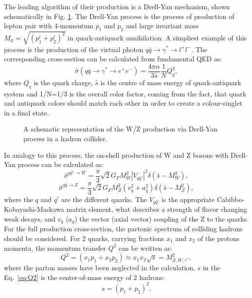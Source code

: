 The leading algorithm of their production is a Drell-Yan mechanism, shown schematically in Fig. \ref{fig:DY}. The Drell-Yan process is the process of production of lepton pair with 4-momentum $p_1$ and $p_2$ and large invariant mass $M_{ll}=\sqrt{(p_1^l +p_2^l)^2}$ in quark-antiquark annihilation. A simpliest example of this process is the production of the virtual photon $q\bar{q} \to \gamma^{*} \to l^+ l^-$. The corresponding cross-section can be calculated from fundamental  QED as:
\begin{equation}
\hat{\sigma}(q\bar{q} \to \gamma^{*} \to e^+ e^-) = \frac{4\pi\alpha}{3\hat{s}}\frac{1}{N}Q^2_q,
\end{equation}
where $Q_q$ is the quark charge, $\hat{s}$ is the centre of mass energy of quark-antiquark system and 1/N=1/3 is the overall color factor, coming from the fact, that quark and antiquark colors should match each other in order to create a colour-singlet in a final state.

\begin{figure}[!tbp]
\caption{A schematic representation of the W/Z production via Drell-Yan process in a hadron collider.}
\label{fig:DY}
\end{figure}

In analogy to this process, the on-shell production of W and Z bosons with Drell-Yan process can be calculated as:
\begin{equation}
\hat{\sigma}^{q\bar{q}' \to W} = \frac{\pi}{3}\sqrt{2}G_F M^2_W | V_{q\bar{q}'}|^2 \delta (\hat{s}-M^2_{W}),
\end{equation}
\begin{equation}
\hat{\sigma}^{q\bar{q} \to Z} = \frac{\pi}{3}\sqrt{2}G_F M^2_Z (v^2_q+a^2_q) \delta (\hat{s}-M^2_{Z}),
\end{equation}
where the $q$ and $q'$ are the different quarks. The $V_{q\bar{q}'}$ is the appropriate Cabibbo-Kobayashi-Maskawa matrix element, what describes a strength of flavor changing weak decays, and $v_q$ ($a_q$) the vector (axial vector) coupling of the Z to the quarks. For the full production cross-section, the partonic spectrum of colliding hadrons should be considered. For 2 quarks, carrying fractions $x_1$ and $x_2$ of the protons momenta, the momentum transfer $Q^2$ can be written as:
\begin{equation}\label{eq:Q2}
Q^2 = (x_1p_1 + x_2p_2) \approx x_1 x_2 \sqrt{s} = M^2_{Z,W,\gamma^{*}},
\end{equation}
where the parton masses have been neglected in the calculation,  $s$ in the Eq.~\ref{eq:Q2} is the center-of-mass energy of 2 hadrons:
\begin{equation}
s=(p_1+p_2)^2.
\end{equation}


